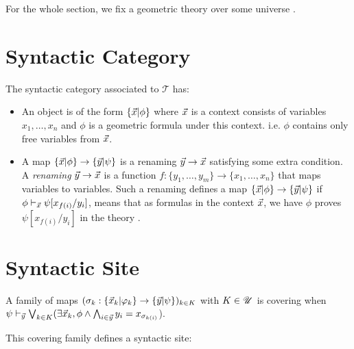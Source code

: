 For the whole section, we fix a geometric theory \thT{} over some universe \Univ{}.

\section{Syntactic Category}
\begin{definition}
  \leanok
  The syntactic category associated to $\mathcal{T}$ has:
  \begin{itemize}
    \item An object is of the form $\{ \vec{x} | \phi \}$ where $\vec{x}$ is a context consists of variables $x_1, \ldots, x_{n}$ and $\phi $ is a geometric
    formula under this context. i.e. $\phi$ contains only free variables from $\vec{x}$.
    \item A map $\{ \vec{x} | \phi \}\to \{ \vec{y} | \psi \}$ is a renaming $\vec{y}\to \vec{x}$ satisfying some extra condition.
    A \emph{renaming} $\vec{y}\to \vec{x}$ is a function $f:\{y_1,\ldots,y_m\}\to \{x_1,\ldots,x_n\}$ that maps variables to variables.
    Such a renaming defines a map $\{ \vec{x} | \phi \}\to \{ \vec{y} | \psi \}$ if $\phi\vdash_{\vec{x}}\psi[x_{f(i)}/y_i]$, means that as formulas in the context $\vec{x}$, we have $\phi$
    proves $\psi[x_{f(i)}/y_i]$ in the theory  \thT{}.
  \end{itemize}
\end{definition}



\section{Syntactic Site}
\begin{definition}
  \label{Def:CoveringFamily}
  \leanok
  A family of maps $(\sigma_k : \{ \vec{x}_k | \varphi_k \}\to \{ \vec{y} | \psi \})_{k \in K}$ with $K \in \mathscr{U}$ is covering when
  $\psi \vdash_{\vec{y}} \bigvee_{k \in K} (\exists \vec{x}_k, \phi \wedge \bigwedge_{i \in \vec{y}} y_i = x_{\sigma_{k(i)}}$).
\end{definition}

This covering family defines a syntactic site:

